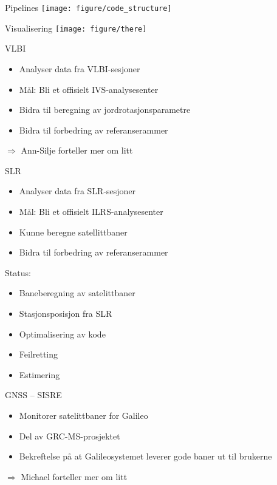 \documentclass[12pt,table,t]{beamer}
\newcommand{\yes}{{\color{kvgreen}\CheckmarkBold}}
\newcommand{\no}{{\color{kvred}\XSolidBold}}
\begin{document}
\begin{frame}{Pipelines}
  \texttt{[image: figure/code\_structure]}
\end{frame}


\begin{frame}{Visualisering}
  \texttt{[image: figure/there]}
\end{frame}


\begin{frame}{VLBI}
  \begin{itemize}
  \item Analyser data fra VLBI-sesjoner
  \item Mål: Bli et offisielt IVS-analysesenter
  \item Bidra til beregning av jordrotasjonsparametre
  \item Bidra til forbedring av referanserammer
  \end{itemize}

  \pause
  \vfill
  \qquad $\Rightarrow$ Ann-Silje forteller mer om litt
\end{frame}


\begin{frame}{SLR}
  \begin{itemize}
  \item Analyser data fra SLR-sesjoner
  \item Mål: Bli et offisielt ILRS-analysesenter
  \item Kunne beregne satellittbaner
  \item Bidra til forbedring av referanserammer
  \end{itemize}

  \pause
  \vfill
  Status:
  \begin{itemize}
  \item Baneberegning av satelittbaner \yes
  \item Stasjonsposisjon fra SLR \yes
  \item Optimalisering av kode \yes
  \item Feilretting \no
  \item Estimering \no
  \end{itemize}
\end{frame}


\begin{frame}{GNSS -- SISRE}
  \begin{itemize}
  \item Monitorer satelittbaner for Galileo
  \item Del av GRC-MS-prosjektet
  \item Bekreftelse på at Galileosystemet leverer gode baner ut til brukerne
  \end{itemize}

  \pause
  \vfill
  \qquad $\Rightarrow$ Michael forteller mer om litt
\end{frame}
\end{document}
